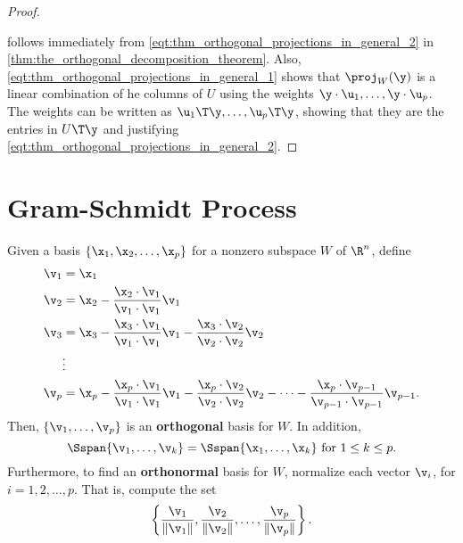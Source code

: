 \begin{proof}
  \label{prf:orthogonal_projections_in_general}

   follows immediately from
  \cref{eqt:thm_orthogonal_projections_in_general_2} in
  \cref{thm:the_orthogonal_decomposition_theorem}. Also,
  \cref{eqt:thm_orthogonal_projections_in_general_1} shows that $\proj_W(\y)$ is
  a linear combination of he columns of $U$ using the weights $\y \cdot \u_1,
  \dots, \y \cdot \u_p$. The weights can be written as $\u_1\T\y, \dots,
  \u_p\T\y$, showing that they are the entries in $U\T\y$ and justifying
  \cref{eqt:thm_orthogonal_projections_in_general_2}.
\end{proof}


\section{Gram-Schmidt Process}
\label{sec:gram_schmidt_process}

\begin{theorem}
  \label{thm:the_gram_schmidt_process}

  Given a basis $\{\x_1, \x_2, \dots, \x_p\}$ for a nonzero subspace $W$ of
  $\R^n$, define
  \begin{align*}
    \v_1 &= \x_1 \\
    \v_2 &= \x_2 - \frac{\x_2 \cdot \v_1}{\v_1 \cdot \v_1}\v_1 \\
    \v_3 &= \x_3 - \frac{\x_3 \cdot \v_1}{\v_1 \cdot \v_1}\v_1 - \frac{\x_3 \cdot \v_2}{\v_2 \cdot \v_2}\v_2 \\
         &\vdots \\
    \v_p &= \x_p - \frac{\x_p \cdot \v_1}{\v_1 \cdot \v_1}\v_1 - \frac{\x_p \cdot \v_2}{\v_2 \cdot \v_2}\v_2 - \cdots - \frac{\x_p \cdot \v_{p-1}}{\v_{p-1} \cdot \v_{p-1}}\v_{p-1}
  .\end{align*}
  Then, $\{\v_1, \dots, \v_p\}$ is an \textbf{orthogonal} basis for $W$.
  In addition,
  \begin{equation}
    \label{eqt:thm_the_gram_schmidt_process_1}
    \Sspan\{\v_1, \dots, \v_k\} = \Sspan\{\x_1, \dots, \x_k\}~\textrm{for}~1 \le k \le p
  .\end{equation}
  Furthermore, to find an \textbf{orthonormal} basis for $W$, normalize
  each vector $\v_i$, for $i = 1, 2, \dots, p$. That is, compute the set
  \[%
    \left\{\frac{\v_1}{\lVert \v_1 \rVert}, \frac{\v_2}{\lVert \v_2 \rVert}, \dots, \frac{\v_p}{\lVert \v_p \rVert}\right\}
  .\]%
\end{theorem}

